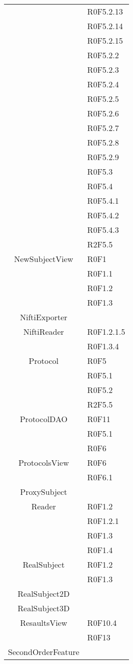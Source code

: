 \begin{center}
\begin{longtable}{|c|l|}
 & R0F5.2.13 \\
 & R0F5.2.14 \\
 & R0F5.2.15 \\
 & R0F5.2.2 \\
 & R0F5.2.3 \\
 & R0F5.2.4 \\
 & R0F5.2.5 \\
 & R0F5.2.6 \\
 & R0F5.2.7 \\
 & R0F5.2.8 \\
 & R0F5.2.9 \\
 & R0F5.3 \\
 & R0F5.4 \\
 & R0F5.4.1 \\
 & R0F5.4.2 \\
 & R0F5.4.3 \\
 & R2F5.5 \\
\hline 
NewSubjectView & R0F1 \\
 & R0F1.1 \\
 & R0F1.2 \\
 & R0F1.3 \\
\hline 
NiftiExporter &  \\
\hline 
NiftiReader & R0F1.2.1.5 \\
 & R0F1.3.4 \\
\hline 
Protocol & R0F5 \\
 & R0F5.1  \\
 & R0F5.2  \\
 & R2F5.5 \\
\hline 
ProtocolDAO & R0F11 \\
 & R0F5.1  \\
 & R0F6 \\
\hline 
ProtocolsView & R0F6 \\
 & R0F6.1 \\
\hline 
ProxySubject &  \\
\hline 
Reader & R0F1.2 \\
 & R0F1.2.1 \\
 & R0F1.3 \\
 & R0F1.4 \\
\hline 
RealSubject & R0F1.2 \\
 & R0F1.3 \\
\hline 
RealSubject2D &  \\
\hline 
RealSubject3D &  \\
\hline 
ResaultsView & R0F10.4  \\
 & R0F13 \\
\hline 
SecondOrderFeature &  \\

\end{longtable}
\end{center}
